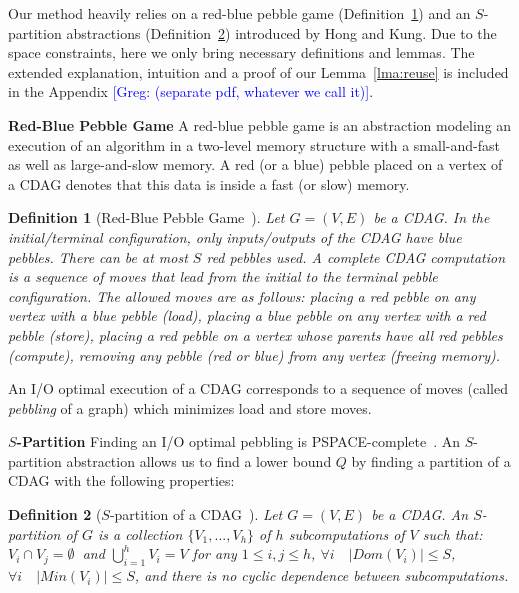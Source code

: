 \documentclass[sigplan,review,anonymous]{acmart}\settopmatter{printfolios=true,printccs=false,printacmref=false}
\newcommand\greg[1]{\textcolor{blue}{[Greg: #1]}}
\newtheorem{defn}{Definition}
\newcommand{\macb}[1]{\textbf{\textsf{#1}}}
\begin{document}
Our method heavily relies on a red-blue pebble game 
(Definition~\ref{df:redbluegame}) 
and an $S$-partition abstractions (Definition~\ref{df:s-partition}) introduced 
by Hong and Kung. Due to the space constraints, here we only bring necessary 
definitions and lemmas. The 
extended explanation, intuition and a proof of our Lemma~\ref{lma:reuse} is 
included in the Appendix \greg{(separate pdf, whatever we call it)}.

\macb{Red-Blue Pebble Game}
A red-blue pebble game is an abstraction modeling an execution of an algorithm 
in a two-level memory structure with a 
small-and-fast
as well as large-and-slow memory. A red (or a blue) pebble placed on a vertex 
of a CDAG denotes that this data is inside a fast (or slow) memory. 
 \begin{defn}[Red-Blue Pebble Game~\cite{redblue}] \label{df:redbluegame}
Let $G = (V,E)$ be a CDAG. 
In the initial/terminal configuration, only inputs/outputs of the CDAG have
blue pebbles.
%
There can be at most $S$ red pebbles used. A complete CDAG computation is a
sequence of moves that lead from the initial to the terminal pebble
configuration.
%
The allowed moves are as follows:  placing a red pebble on any vertex
with a blue pebble (load),  placing a blue pebble on any vertex with 
a red
pebble (store),  placing a red pebble on a vertex whose parents have 
all red
pebbles (compute),  removing any pebble (red or blue) from any vertex 
(freeing memory).
\end{defn}

An I/O optimal execution of a CDAG corresponds to a sequence of moves (called 
\emph{pebbling} of a graph) which minimizes load  and store 
 moves.

\macb{$S$-Partition} Finding an I/O optimal pebbling is 
PSPACE-complete~\cite{redbluecomplete}. An $S$-partition abstraction allows us 
to find a lower bound $Q$ by finding a partition of a CDAG with the following 
properties:

\begin{defn}[$S$-partition of a CDAG~\cite{redblue}] \label{df:s-partition}
	Let $G = (V,E)$ be a CDAG. An $S$-partition of $G$ is a collection $\{V_1, 
	...,
	V_h\}$ of $h$ subcomputations of $ V$ such that:  $V_i \cap V_j
	=\emptyset\ $ and $\bigcup_{i=1}^{h} V_i=V$ for any $1 \le i,j \le h$,
	 $\forall i\quad |Dom(V_i)| \le S$,  $\forall i\quad
	|Min(V_i)| \le S$, and  there is no cyclic dependence between
	subcomputations.
\end{defn}
\end{document}
